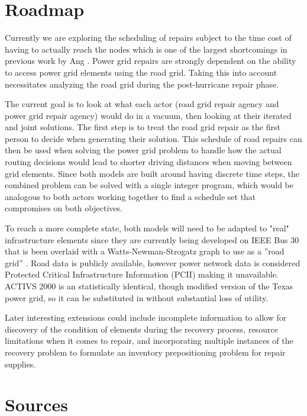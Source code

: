 \documentclass{article}
\begin{document}
	\section{Roadmap}
	Currently we are exploring the scheduling of repairs subject to the time cost of having to actually reach the nodes which is one of the largest shortcomings in previous work by Ang \cite{NPSMasters}. Power grid repairs are strongly dependent on the ability to access power grid elements using the road grid. Taking this into account necessitates analyzing the road grid during the post-hurricane repair phase.
	
	The current goal is to look at what each actor (road grid repair agency and power grid repair agency) would do in a vacuum, then looking at their iterated and joint solutions. The first step is to treat the road grid repair as the first person to decide when generating their solution. This schedule of road repairs can then be used when solving the power grid problem to handle how the actual routing decisions would lead to shorter driving distances when moving between grid elements. Since both models are built around having discrete time steps, the combined problem can be solved with a single integer program, which would be analogous to both actors working together to find a schedule set that compromises on both objectives.
	
	To reach a more complete state, both models will need to be adapted to "real" infrastructure elements since they are currently being developed on IEEE Bus 30 that is been overlaid with a Watts-Newman-Strogatz graph to use as a ''road grid'' \cite{Newman2000, WattsEA1998}. Road data is publicly available, however power network data is considered Protected Critical Infrastructure Information (PCII) making it unavailable. ACTIVS 2000 is an statistically identical, though modified version of the Texas power grid, so it can be substituted in without substantial loss of utility.
	
	Later interesting extensions could include incomplete information to allow for discovery of the condition of elements during the recovery process, resource limitations when it comes to repair, and incorporating multiple instances of the recovery problem to formulate an inventory prepositioning problem for repair supplies.
	\section{Sources}
	\printbibliography
\end{document}
